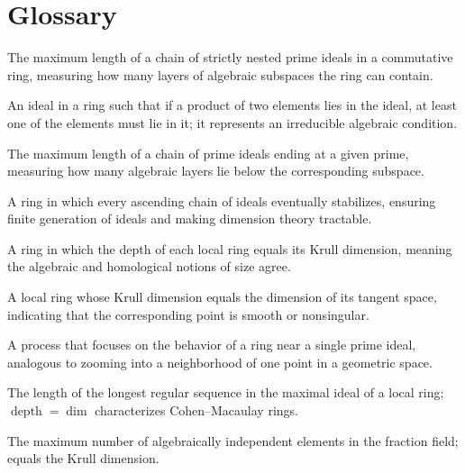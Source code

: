 \section*{Glossary}
\begin{description}[leftmargin=*,style=nextline,itemsep=0.3em]
\item[\textbf{Krull dimension.}] The maximum length of a chain of strictly nested prime ideals in a commutative ring, measuring how many layers of algebraic subspaces the ring can contain.
\item[\textbf{Prime ideal.}] An ideal in a ring such that if a product of two elements lies in the ideal, at least one of the elements must lie in it; it represents an irreducible algebraic condition.
\item[\textbf{Height.}] The maximum length of a chain of prime ideals ending at a given prime, measuring how many algebraic layers lie below the corresponding subspace.
\item[\textbf{Noetherian ring.}] A ring in which every ascending chain of ideals eventually stabilizes, ensuring finite generation of ideals and making dimension theory tractable.
\item[\textbf{Cohen--Macaulay ring.}] A ring in which the depth of each local ring equals its Krull dimension, meaning the algebraic and homological notions of size agree.
\item[\textbf{Regular local ring.}] A local ring whose Krull dimension equals the dimension of its tangent space, indicating that the corresponding point is smooth or nonsingular.
\item[\textbf{Localization.}] A process that focuses on the behavior of a ring near a single prime ideal, analogous to zooming into a neighborhood of one point in a geometric space.
\item[\textbf{Depth.}] The length of the longest regular sequence in the maximal ideal of a local ring; $\operatorname{depth}=\dim$ characterizes Cohen--Macaulay rings.
\item[\textbf{Transcendence degree.}] The maximum number of algebraically independent elements in the fraction field; equals the Krull dimension.
\end{description}

